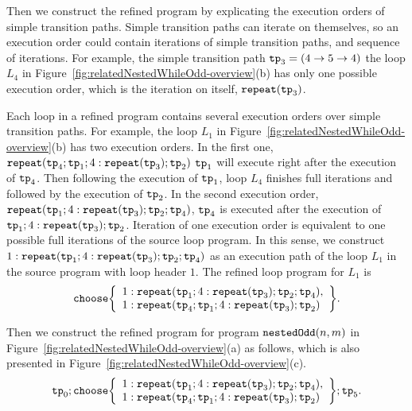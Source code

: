 Then we construct the refined program by explicating the execution orders of simple transition paths.
Simple transition paths can iterate on themselves, so an execution order could
contain iterations of simple transition paths, and sequence of iterations.
For example, the simple transition path $\mathtt{tp}_3 = (4 \to 5 \to 4)$
the loop $L_4$ in Figure~\ref{fig:relatedNestedWhileOdd-overview}(b) has only one possible execution order,
which is the iteration on itself, $\mathtt{repeat}(\mathtt{tp}_3)$.

Each loop in a refined program contains several execution orders over simple transition paths.
For example, the loop $L_1$ in Figure~\ref{fig:relatedNestedWhileOdd-overview}(b)
has two execution orders. In the first one,
$\mathtt{repeat}(\mathtt{tp}_4; \mathtt{tp}_1; 4:\mathtt{repeat}(\mathtt{tp}_3); \mathtt{tp}_2)$ 
$\mathtt{tp}_1$ will execute right after the execution of $\mathtt{tp}_4$.
Then following the execution of $\mathtt{tp}_1$, loop $L_4$ finishes full iterations and followed by the execution of $\mathtt{tp}_2$.
In the second execution order,
$\mathtt{repeat}(\mathtt{tp}_1; 4:\mathtt{repeat}(\mathtt{tp}_3); \mathtt{tp}_2; \mathtt{tp}_4)$,
$\mathtt{tp}_4$ is executed after the execution of $\mathtt{tp}_1; 4:\mathtt{repeat}(\mathtt{tp}_3); \mathtt{tp}_2$.
Iteration of one execution order is equivalent to one possible full iterations of the source loop program.
In this sense, we construct $1: \mathtt{repeat}(\mathtt{tp}_1; 4:\mathtt{repeat}(\mathtt{tp}_3); \mathtt{tp}_2; \mathtt{tp}_4)$ as an execution path of the loop $L_1$ in the source program with loop header $1$.
The refined loop program for $L_1$ is 
\[
\rpchoose{ 
 \begin{array}{l}
 1: \rprepeat(\tpath_1; 4:\rprepeat(\tpath_3); \tpath_2; \tpath_4), \\
 1: \rprepeat(\tpath_4; \tpath_1; 4:\rprepeat(\tpath_3); \tpath_2) 
 \end{array}
 }.
\]

Then we construct the refined program for program $\mathtt{nestedOdd}(n, m)$ in Figure~\ref{fig:relatedNestedWhileOdd-overview}(a) as follows, which is also presented in Figure~\ref{fig:relatedNestedWhileOdd-overview}(c).
\[
 \tpath_0 ; \rpchoose{ 
 \begin{array}{l}
    1: \rprepeat(\tpath_1; 4:\rprepeat(\tpath_3); \tpath_2; \tpath_4), \\
    1: \rprepeat(\tpath_4; \tpath_1; 4:\rprepeat(\tpath_3); \tpath_2) 
 \end{array}
 }; \tpath_5.
\]


